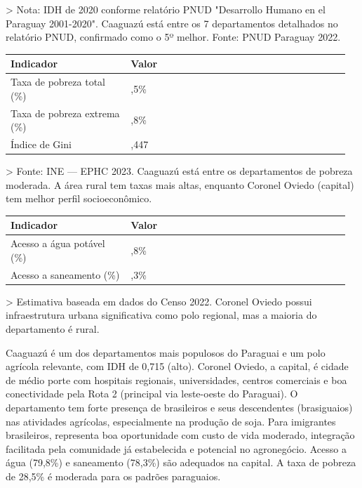 > Nota: IDH de 2020 conforme relatório PNUD "Desarrollo Humano en el Paraguay 2001-2020". Caaguazú está entre os 7 departamentos detalhados no relatório PNUD, confirmado como o 5º melhor. Fonte: PNUD Paraguay 2022.


{\small
\setlength{\tabcolsep}{3pt}
\renewcommand{\arraystretch}{1.12}
\begin{tabularx}{\linewidth}{>{\raggedright\arraybackslash}p{0.34\linewidth} >{\raggedright\arraybackslash}p{0.62\linewidth}}
\toprule
Indicador & Valor \\
\midrule
Taxa de pobreza total (\%) & 28,5\% \\
Taxa de pobreza extrema (\%) & 6,8\% \\
Índice de Gini & 0,447 \\
\bottomrule
\end{tabularx}
}

> Fonte: INE --- EPHC 2023. Caaguazú está entre os departamentos de pobreza moderada. A área rural tem taxas mais altas, enquanto Coronel Oviedo (capital) tem melhor perfil socioeconômico.


{\small
\setlength{\tabcolsep}{3pt}
\renewcommand{\arraystretch}{1.12}
\begin{tabularx}{\linewidth}{>{\raggedright\arraybackslash}p{0.34\linewidth} >{\raggedright\arraybackslash}p{0.62\linewidth}}
\toprule
Indicador & Valor \\
\midrule
Acesso a água potável (\%) & 79,8\% \\
Acesso a saneamento (\%) & 78,3\% \\
\bottomrule
\end{tabularx}
}

> Estimativa baseada em dados do Censo 2022. Coronel Oviedo possui infraestrutura urbana significativa como polo regional, mas a maioria do departamento é rural.


Caaguazú é um dos departamentos mais populosos do Paraguai e um polo agrícola relevante, com IDH de 0,715 (alto). Coronel Oviedo, a capital, é cidade de médio porte com hospitais regionais, universidades, centros comerciais e boa conectividade pela Rota 2 (principal via leste-oeste do Paraguai). O departamento tem forte presença de brasileiros e seus descendentes (brasiguaios) nas atividades agrícolas, especialmente na produção de soja. Para imigrantes brasileiros, representa boa oportunidade com custo de vida moderado, integração facilitada pela comunidade já estabelecida e potencial no agronegócio. Acesso a água (79,8\%) e saneamento (78,3\%) são adequados na capital. A taxa de pobreza de 28,5\% é moderada para os padrões paraguaios.


